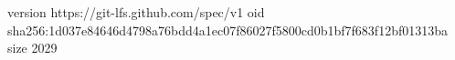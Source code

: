 version https://git-lfs.github.com/spec/v1
oid sha256:1d037e84646d4798a76bdd4a1ec07f86027f5800cd0b1bf7f683f12bf01313ba
size 2029
